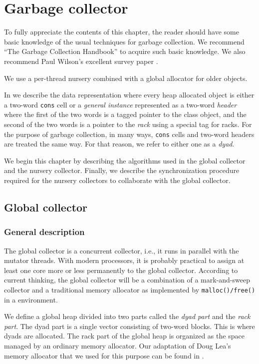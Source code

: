 \chapter{Garbage collector}
\label{chap-garbage-collector}

To fully appreciate the contents of this chapter, the reader should
have some basic knowledge of the usual techniques for garbage
collection.  We recommend ``The Garbage Collection Handbook''
\cite{Jones:2011:GCH:2025255} to acquire such basic knowledge.  We
also recommend Paul Wilson's excellent survey paper
\cite{Wilson:1992:UGC:645648.664824}.

We use a per-thread nursery combined with a global allocator for older
objects.

In  we describe the data
representation where every heap allocated object is either a two-word
\texttt{cons} cell or a \emph{general instance} represented as a
two-word \emph{header} where the first of the two words is a tagged
pointer to the class object, and the second of the two words is a
pointer to the \emph{rack} using a special tag for racks.  For the
purpose of garbage collection, in many ways, \texttt{cons} cells and
two-word headers are treated the same way.  For that reason, we refer
to either one as a \emph{dyad}.

We begin this chapter by describing the algorithms used in the global
collector and the nursery collector.  Finally, we describe the
synchronization procedure required for the nursery collectors to
collaborate with the global collector.

\section{Global collector}
\subsection{General description}

The global collector is a concurrent collector, i.e., it runs in
parallel with the mutator threads.  With modern processors, it is
probably practical to assign at least one core more or less
permanently to the global collector.  According to current thinking,
the global collector will be a combination of a mark-and-sweep
collector and a  traditional memory allocator as implemented by
\texttt{malloc()/free()} in a \clanguage{} environment.

We define a global heap divided into two parts called the \emph{dyad
  part} and the \emph{rack part}.  The dyad part is a single vector
consisting of two-word blocks.  This is where dyads are allocated.
The rack part of the global heap is organized as the space managed by
an ordinary memory allocator.  Our adaptation of Doug Lea's memory
allocator that we used for this purpose can be found in
.

